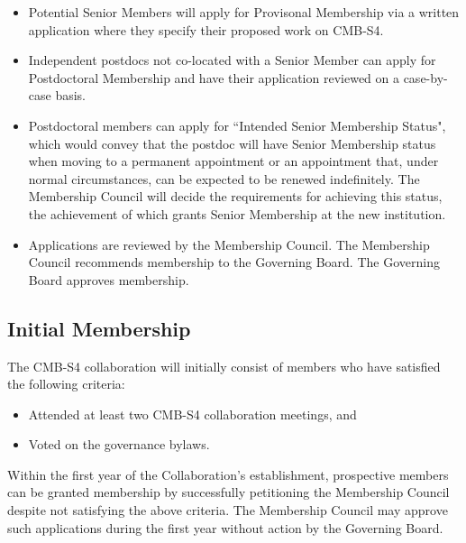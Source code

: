 \begin{itemize}

\item Potential Senior Members will apply for Provisonal Membership via a written application where they specify their proposed work on CMB-S4. 

\item Independent postdocs not co-located with a Senior Member can apply for Postdoctoral Membership and have their application reviewed on a case-by-case basis. 

\item Postdoctoral members can apply for ``Intended Senior Membership Status", which would convey that the postdoc will have Senior Membership status when moving to a permanent appointment or an appointment that, under normal circumstances, can be expected to be renewed indefinitely.  The Membership Council will decide the requirements for achieving this status, the achievement of which grants Senior Membership at the new institution.

\item Applications are reviewed by the Membership Council. The Membership Council recommends membership to the Governing Board.  The Governing Board approves membership.

\end{itemize}

\subsection{Initial Membership}
\label{sec:initmembership}
The CMB-S4 collaboration will initially consist of members who have satisfied the following criteria:

\begin{itemize}
\item Attended at least two CMB-S4 collaboration meetings, and 

\item Voted on the governance bylaws.
\end{itemize}

Within the first year of the Collaboration's establishment, prospective members can be granted membership by successfully petitioning the Membership Council despite not satisfying the above criteria.  The Membership Council may approve such applications during the first year without action by the Governing Board.  

